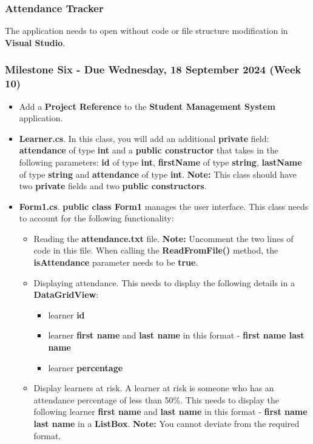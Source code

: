 \documentclass{article}
\begin{document}
\subsubsection*{Attendance Tracker}

The application needs to open without code or file structure modification in \textbf{Visual Studio}.

\subsubsection*{Milestone Six - Due Wednesday, 18 September 2024 (Week 10)}

\begin{itemize}
    \item Add a \textbf{Project Reference} to the \textbf{Student Management System} application.
    \item \textbf{Learner.cs}. In this class, you will add an additional \textbf{private} field: \textbf{attendance} of type \textbf{int} and a \textbf{public constructor} that takes in the following parameters: \textbf{id} of type \textbf{int}, \textbf{firstName} of type \textbf{string}, \textbf{lastName} of type \textbf{string} and \textbf{attendance} of type \textbf{int}. \textbf{Note:} This class should have two \textbf{private} fields and two \textbf{public constructors}.
    \item \textbf{Form1.cs}. \textbf{public class Form1} manages the user interface. This class needs to account for the following functionality:
    \begin{itemize}
        \item Reading the \textbf{attendance.txt} file. \textbf{Note:} Uncomment the two lines of code in this file. When calling the \textbf{ReadFromFile()} method, the \textbf{isAttendance} parameter needs to be \textbf{true}.  
        \item Displaying attendance. This needs to display the following details in a \textbf{DataGridView}:
        \begin{itemize}
            \item learner \textbf{id}
            \item learner \textbf{first name} and \textbf{last name} in this format - \textbf{first name last name}
            \item learner \textbf{percentage}
        \end{itemize}
        \item Display learners at risk. A learner at risk is someone who has an attendance percentage of less than 50\%. This needs to display the following learner \textbf{first name} and \textbf{last name} in this format - \textbf{first name last name} in a \textbf{ListBox}. \textbf{Note:} You cannot deviate from the required format.
    \end{itemize}
\end{itemize}
\end{document}
